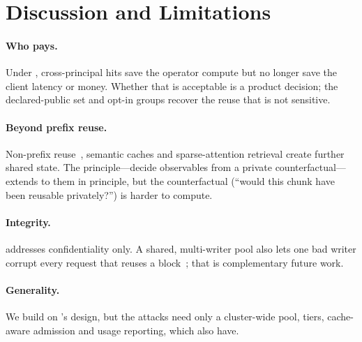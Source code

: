 \section{Discussion and Limitations}
\label{sec:discussion}

\paragraph{Who pays.} Under \sys, cross-principal hits save the operator compute
but no longer save the client latency or money. Whether that is acceptable is a
product decision; the declared-public set and opt-in groups recover the reuse
that is not sensitive. 

\paragraph{Beyond prefix reuse.} Non-prefix reuse~\cite{yao2025cacheblend},
semantic caches and sparse-attention retrieval create further shared state.
The \vcd principle---decide observables from a private counterfactual---extends
to them in principle, but the counterfactual (``would this chunk have been
reusable privately?'') is harder to compute. 

\paragraph{Integrity.} \sys addresses confidentiality only. A shared,
multi-writer pool also lets one bad writer corrupt every request that reuses a
block~\cite{cachemecatchyou2026,bitflip2026kv}; that is complementary future work.

\paragraph{Generality.} We build on \mc's design, but the attacks need only a
cluster-wide pool, tiers, cache-aware admission and usage reporting, which
 also
have.
